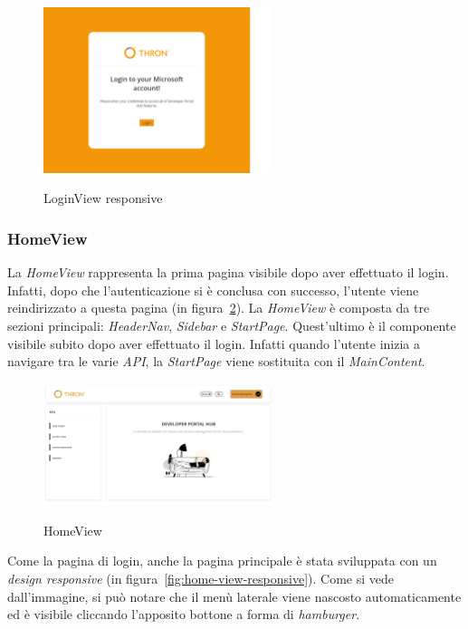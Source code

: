 \begin{figure}[ht]
  \centering
  \includegraphics[width=0.6\textwidth, alt={Pagina di login responsive dell'applicazione}]{images/frontend/LoginViewRes.jpg}
  \caption{LoginView responsive}\label{fig:login-view-responsive}
\end{figure}
\pagebreak

\subsubsection{HomeView}\label{subsubsec:home-view}
La \textit{HomeView} rappresenta la prima pagina visibile dopo aver effettuato il login. Infatti, dopo che l'autenticazione si è conclusa con successo,
l'utente viene reindirizzato a questa pagina (in figura~\ref{fig:home-view}).
La \textit{HomeView} è composta da tre sezioni principali: \textit{HeaderNav}, \textit{Sidebar} e \textit{StartPage}. Quest'ultimo è il componente visibile 
subito dopo aver effettuato il login. Infatti quando l'utente inizia a navigare tra le varie \textit{API}, la \textit{StartPage} viene sostituita con il \textit{MainContent}.

\begin{figure}[ht]
  \centering
  \includegraphics[width=0.6\textwidth, alt={Pagina principale dell'applicazione}]{images/frontend/HomeView.jpg}
  \caption{HomeView}\label{fig:home-view}
\end{figure}

Come la pagina di login, anche la pagina principale è stata sviluppata con un \textit{design responsive} (in figura~\ref{fig:home-view-responsive}).
Come si vede dall'immagine, si può notare che il menù laterale viene nascosto automaticamente ed è visibile cliccando l'apposito bottone a forma di \textit{hamburger}.

